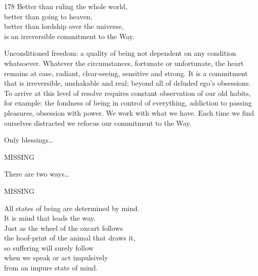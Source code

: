 
\begin{dhpVerse}{178}
\label{dhp-178}
Better than ruling the whole world,\\
better than going to heaven,\\
better than lordship over the universe,\\
is an irreversible commitment to the Way.
\end{dhpVerse}

\begin{dhpRefl}

Unconditioned freedom: a quality of being not dependent on any
condition whatsoever. Whatever the circumstances, fortunate or
unfortunate, the heart remains at ease, radiant, clear-seeing,
sensitive and strong. It is a commitment that is irreversible,
unshakable and real; beyond all of deluded ego's obsessions. To
arrive at this level of resolve requires constant observation of our
old habits, for example: the fondness of being in control of
everything, addiction to passing pleasures, obsession with power. We
work with what we have. Each time we find ourselves distracted we
refocus our commitment to the Way.

\end{dhpRefl}


\begin{dhpVerse}{76}
\label{dhp-76}
Only blessings\ldots

MISSING
\end{dhpVerse}

\begin{dhpRefl}
There are two ways\ldots

MISSING
\end{dhpRefl}


\begin{dhpVerse}{1}
\label{dhp-1}
All states of being are determined by mind.\\
It is mind that leads the way.\\
Just as the wheel of the oxcart follows\\
the hoof-print of the animal that draws it,\\
so suffering will surely follow\\
when we speak or act impulsively\\
from an impure state of mind.
\end{dhpVerse}


